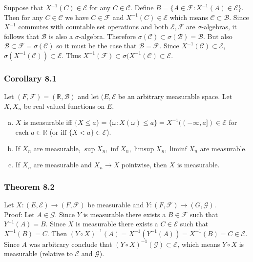 \documentclass{article}
\begin{document}
{Suppose that $X^{-1}(C) \in \mathcal{E}$ for any $C \in \mathcal{C}$. Define $B = \{A \in \mathcal{F} : X^{-1}(A) \in \mathcal{E}\}$. Then for any $C \in \mathcal{C}$ we have $C \in \mathcal{F}$ and $X^{-1}(C) \in \mathcal{E}$ which means $\mathcal{C} \subset \mathcal{B}$. Since $X^{-1}$ commutes with countable set operations and both $\mathcal{E}, \mathcal{F}$ are $\sigma$-algebras, it follows that $\mathcal{B}$ is also a $\sigma$-algebra. Therefore $\sigma(\mathcal{C}) \subset \sigma(\mathcal{B}) = \mathcal{B}$. But also $\mathcal{B} \subset \mathcal{F} = \sigma(\mathcal{C})$ so it must be the case that $\mathcal{B} = \mathcal{F}$. Since $X^{-1}(\mathcal{C}) \subset \mathcal{E}$, $\sigma(X^{-1}(\mathcal{C})) \subset \mathcal{E}$. Thus $X^{-1}(\mathcal{F}) \subset \sigma(X^{-1}(\mathcal{C}) \subset \mathcal{E}$. 

\subsubsection*{Corollary 8.1}

Let $(F, \mathcal{F}) = (\mathbb{R}, \mathcal{B})$ and let $(E, \mathcal{E}$ be an arbitrary measurable space. Let $X, X_n$ be real valued functions on $E$. 

\begin{enumerate}[a)]
\item $X$ is measurable iff $\{X \leq a\} = \{\omega : X(\omega) \leq a\} = X^{-1}((-\infty, a]) \in \mathcal{E}$ for each $a \in \mathbb{R}$ (or iff $\{X < a\} \in \mathcal{E}$). 

\item If $X_n$ are measurable, $\sup X_n, \inf X_n, \limsup X_n, \liminf X_n$ are measurable. 

\item If $X_n$ are measurable and $X_n \rightarrow X$ pointwise, then $X$ is measurable.
\end{enumerate}

\subsubsection*{Theorem 8.2}

Let $X: (E,\mathcal{E}) \rightarrow (F, \mathcal{F})$ be measurable and $Y: (F, \mathcal{F}) \rightarrow (G, \mathcal{G})$. \\

Proof: Let $A \in \mathcal{G}$. Since $Y$ is measurable there exists a $B \in \mathcal{F}$ such that $Y^{-1}(A) = B$. Since $X$ is measurable there exists a $C \in \mathcal{E}$ such that $X^{-1}(B) = C$. Then $(Y\circ X)^{-1}(A) = X^{-1}(Y^{-1}(A)) = X^{-1}(B) = C \in \mathcal{E}$. Since $A$ was arbitrary conclude that $(Y \circ X)^{-1}(\mathcal{G}) \subset \mathcal{E}$, which means $Y \circ X$ is measurable (relative to $\mathcal{E}$ and $\mathcal{G}$). \\

}
\end{document}

